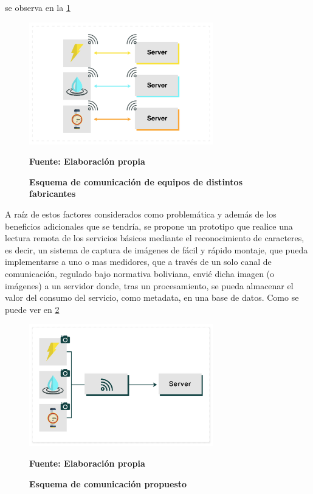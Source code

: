 \begin{itemize}
    se observa en la \ref{fig:old_schema}
    \begin{figure}[H]
        \centering
        \includegraphics[width=8cm]{img/intro/esquema_comunicacion_old.png}
        \caption{\textbf{Esquema de comunicación de equipos de distintos fabricantes}}
        \textbf{\small Fuente: Elaboración propia}
        \label{fig:old_schema}
    \end{figure}
\end{itemize}

A raíz de estos factores considerados como problemática y además de los beneficios adicionales que se
tendría, se propone un prototipo que realice una lectura remota de los servicios básicos mediante el
reconocimiento de caracteres, es decir, un sistema de captura de imágenes de fácil y rápido montaje, 
que pueda implementarse a uno o mas medidores, que a través de un solo canal de comunicación, regulado bajo
normativa boliviana, envié dicha imagen (o imágenes) a un servidor donde, tras un procesamiento, se pueda 
almacenar el valor del consumo del servicio, como metadata, en una base de datos. Como se puede ver en \ref{fig:new_schema}
\begin{figure}[H]
    \centering
    \includegraphics[width=8cm]{img/intro/esquema_comunicacion_new.png}
    \caption{\textbf{Esquema de comunicación propuesto}}
    \textbf{\small Fuente: Elaboración propia}
    \label{fig:new_schema}
\end{figure}



